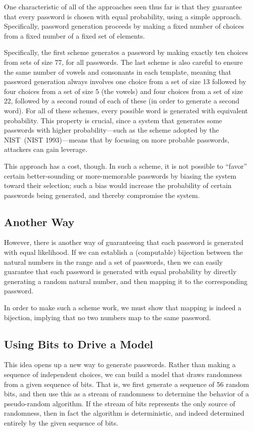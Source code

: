 \documentclass[preprint]{soups}
\let\SOriginalthesubsubsection\thesubsubsection
\newcommand{\Ssubsection}[2]{\subsection[#1]{#2}\let\thesubsubsection\SOriginalthesubsubsection}
\begin{document}
One characteristic of all of the approaches seen thus far is
that they guarantee that every password is chosen with equal
probability, using a simple approach. Specifically, password
generation proceeds by making a fixed number of choices from
a fixed number of a fixed set of elements.

Specifically, the first scheme generates a password by
making exactly ten choices from sets of size 77, for all
passwords. The last scheme is also careful to ensure the
same number of vowels and consonants in each template,
meaning that password generation always involves one choice
from a set of size 13 followed by four choices from a set of
size 5 (the vowels) and four choices from a set of size 22,
followed by a second round of each of these (in order to
generate a second word).  For all of these schemes, every
possible word is generated with equivalent probability. This
property is crucial, since a system that generates some
passwords with higher probability{---}such as the scheme
adopted by the NIST~(NIST 1993){---}means that by
focusing on more probable passwords, attackers can gain
leverage.

This approach has a cost, though. In such a scheme, it is
not possible to {``}favor{''} certain better{-}sounding or
more{-}memorable passwords by biasing the system toward their
selection; such a bias would increase the probability of
certain passwords being generated, and thereby compromise
the system.

\Ssubsection{Another Way}{Another Way}\label{t:x28part_x22Anotherx5fWayx22x29}

However, there is another way of guaranteeing that each
password is generated with equal likelihood. If we can
establish a (computable) bijection between the natural
numbers in the range \relax{\([0, \ldots ,N)\)} and a set of
passwords, then we can easily guarantee that each password
is generated with equal probability by directly generating a
random natural number, and then mapping it to the
corresponding password.

In order to make such a scheme work, we must show that
mapping is indeed a bijection, implying that no two numbers
map to the same password.

\Ssubsection{Using Bits to Drive a Model}{Using Bits to Drive a Model}\label{t:x28part_x22Usingx5fBitsx5ftox5fDrivex5fax5fModelx22x29}

This idea opens up a new way to generate passwords. Rather
than making a sequence of independent choices, we can build
a model that draws randomness from a given sequence of bits.
That is, we first generate a sequence of 56 random bits, and
then use this as a stream of randomness to determine the
behavior of a pseudo{-}random algorithm.  If the stream of
bits represents the only source of randomness, then in fact
the algorithm is deterministic, and indeed determined
entirely by the given sequence of bits.
\end{document}
